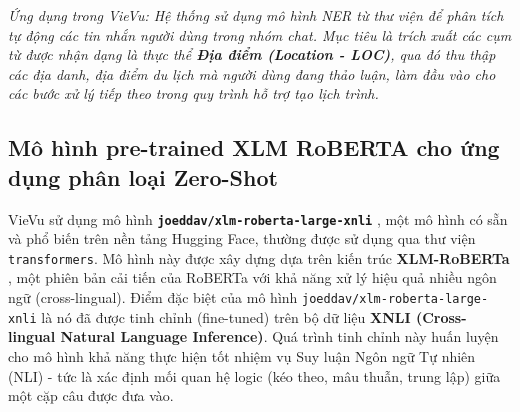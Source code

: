 \textit{Ứng dụng trong VieVu: Hệ thống sử dụng mô hình NER từ thư viện để phân tích tự động các tin nhắn người dùng trong nhóm chat. Mục tiêu là trích xuất các cụm từ được nhận dạng là thực thể \textbf{Địa điểm (Location - LOC)}, qua đó thu thập các địa danh, địa điểm du lịch mà người dùng đang thảo luận, làm đầu vào cho các bước xử lý tiếp theo trong quy trình hỗ trợ tạo lịch trình.}

\subsection{Mô hình pre-trained XLM RoBERTA cho ứng dụng phân loại Zero-Shot}



VieVu sử dụng mô hình \textbf{\texttt{joeddav/xlm-roberta-large-xnli}} \cite{xlm_roberta_xnli_model}, một mô hình có sẵn và phổ biến trên nền tảng Hugging Face, thường được sử dụng qua thư viện \texttt{transformers}. Mô hình này được xây dựng dựa trên kiến trúc \textbf{XLM-RoBERTa} \cite{xlm_roberta_paper}, một phiên bản cải tiến của RoBERTa với khả năng xử lý hiệu quả nhiều ngôn ngữ (cross-lingual). Điểm đặc biệt của mô hình \texttt{joeddav/xlm-roberta-large-xnli} là nó đã được tinh chỉnh (fine-tuned) trên bộ dữ liệu \textbf{XNLI (Cross-lingual Natural Language Inference)}. Quá trình tinh chỉnh này huấn luyện cho mô hình khả năng thực hiện tốt nhiệm vụ Suy luận Ngôn ngữ Tự nhiên (NLI) - tức là xác định mối quan hệ logic (kéo theo, mâu thuẫn, trung lập) giữa một cặp câu được đưa vào.

